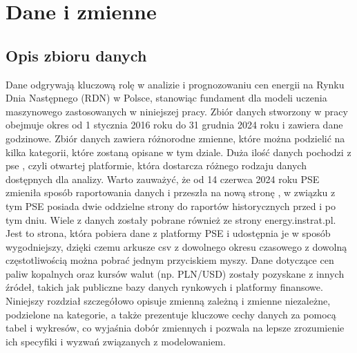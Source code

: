 \chapter{Dane i zmienne}
\label{ch:dane}
\section{Opis zbioru danych}
Dane odgrywają kluczową rolę w analizie i prognozowaniu cen energii na Rynku Dnia Następnego (RDN) w Polsce, stanowiąc fundament dla modeli uczenia maszynowego zastosowanych w niniejszej pracy. Zbiór danych stworzony w pracy obejmuje okres od 1 stycznia 2016 roku do 31 grudnia 2024 roku i zawiera dane godzinowe. Zbiór danych zawiera różnorodne zmienne, które można podzielić na kilka kategorii, które zostaną opisane w tym dziale. Duża ilość danych pochodzi z \gls{pse} \cite{PSEOLD}, czyli otwartej platformie, która dostarcza różnego rodzaju danych dostępnych dla analizy. Warto zauważyć, że od 14 czerwca 2024 roku PSE zmieniła sposób raportowania danych i przeszła na nową stronę \cite{PSENEW}, w związku z tym PSE posiada dwie oddzielne strony do raportów historycznych przed i po tym dniu. Wiele z danych zostały pobrane również ze strony energy.instrat.pl. Jest to strona, która pobiera dane z platformy PSE i udostępnia je w sposób wygodniejszy, dzięki czemu arkusze csv z dowolnego okresu czasowego z dowolną częstotliwością można pobrać jednym przyciskiem myszy. Dane dotyczące cen paliw kopalnych oraz kursów walut (np. PLN/USD) zostały pozyskane z innych źródeł, takich jak publiczne bazy danych rynkowych i platformy finansowe. Niniejszy rozdział szczegółowo opisuje zmienną zależną i zmienne niezależne, podzielone na kategorie, a także prezentuje kluczowe cechy danych za pomocą tabel i wykresów, co wyjaśnia dobór zmiennych i pozwala na lepsze zrozumienie ich specyfiki i wyzwań związanych z modelowaniem.

